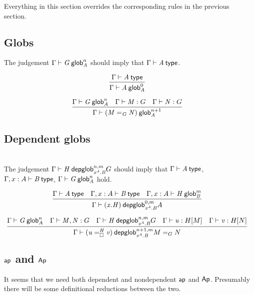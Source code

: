 Everything in this section overrides the corresponding rules in the previous
section.

\subsection{Globs}

The judgement $\text{\ensuremath{\Gamma}} \vdash \mathit{G} \: \mathsf{glob}^{n}_{\mathit{A}}$ should imply that
$\text{\ensuremath{\Gamma}} \vdash \mathit{A} \: \mathsf{type}$.

\begin{small}
  \[\infer{\wfglob{\Gamma}{A}{0}{A}} {\wftype{\Gamma}{A}}\]

  \[\infer{\wfglob{\Gamma}{(\homj{G}{M}{N})}{n+1}{A}} {\wfglob{\Gamma}{G}{n}{A}
    & \ofglob{\Gamma}{M}{G} & \ofglob{\Gamma}{N}{G}}\]
\end{small}

\subsection{Dependent globs}

\\

The judgement $\text{\ensuremath{\Gamma}} \vdash \mathit{H} \: \mathsf{depglob}^{n,m}_{\mathit{x^A.B}}{G}$ should imply that
$\text{\ensuremath{\Gamma}} \vdash \mathit{A} \: \mathsf{type}$, $\text{\ensuremath{\Gamma,x:A}} \vdash \mathit{B} \: \mathsf{type}$, $\text{\ensuremath{\Gamma}} \vdash \mathit{G} \: \mathsf{glob}^{n}_{\mathit{A}}$ hold.

\begin{small}
  \[\infer{\wfdepglob{\Gamma}{(x.H)}{0,m}{x^A.B}{A}}
  {\wftype{\Gamma}{A}
    & \wftype{\Gamma,x:A}{B}
    & \wfglob{\Gamma,x:A}{H}{m}{B}
  }\]

  \[\infer{\wfdepglob{\Gamma}{(\dhomj{H}{u}{v}{\blank})}{n+1,m}
    {x^A.B}{\homj{G}{M}{N}}} {\wfglob{\Gamma}{G}{n}{A} &
    \ofglob{\Gamma}{M,N}{G}
    & \wfdepglob{\Gamma}{H}{n,m}{x^A.B}{G} & \ofdepglob{\Gamma}{u}{H}{M} &
    \ofdepglob{\Gamma}{v}{H}{N} }\]
\end{small}

\subsection{$\mathsf{ap}$ and $\mathsf{Ap}$}

It seems that we need both dependent and nondependent $\mathsf{ap}$ and
$\mathsf{Ap}$. Presumably there will be some definitional reductions between the
two.

